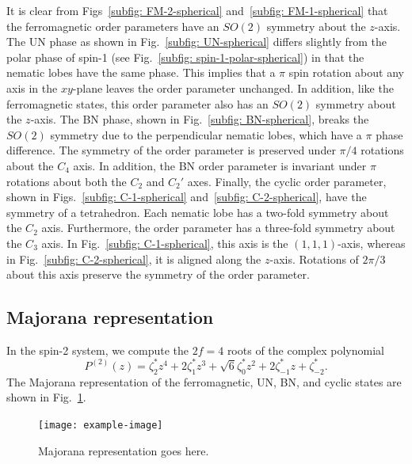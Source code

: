 It is clear from Figs~\ref{subfig: FM-2-spherical}
and~\ref{subfig: FM-1-spherical} that the ferromagnetic order parameters have
an \(SO(2)\) symmetry about the \(z\)-axis.
The UN phase as shown in Fig.~\ref{subfig: UN-spherical} differs slightly from
the polar phase of spin-1 (see Fig.~\ref{subfig: spin-1-polar-spherical}) in
that the nematic lobes have the same phase.
This implies that a \(\pi \) spin rotation about any axis in the \(xy\)-plane
leaves the order parameter unchanged.
In addition, like the ferromagnetic states, this order parameter also has an
\(SO(2)\) symmetry about the \(z\)-axis.
The BN phase, shown in Fig.~\ref{subfig: BN-spherical}, breaks the \(SO(2)\)
symmetry due to the perpendicular nematic lobes, which have a \(\pi \) phase
difference.
The symmetry of the order parameter is preserved under \(\pi/4\) rotations
about the \(C_4\) axis.
In addition, the BN order parameter is invariant under \(\pi \) rotations about
both the \(C_2\) and \(C_2'\) axes.
Finally, the cyclic order parameter, shown in Figs.~\ref{subfig: C-1-spherical}
and~\ref{subfig: C-2-spherical}, have the symmetry of a tetrahedron.
Each nematic lobe has a two-fold symmetry about the \(C_2\) axis.
Furthermore, the order parameter has a three-fold symmetry about the \(C_3\)
axis.
In Fig.~\ref{subfig: C-1-spherical}, this axis is the \((1, 1, 1)\)-axis,
whereas in Fig.~\ref{subfig: C-2-spherical}, it is aligned along the \(z\)-axis.
Rotations of \(2\pi/3\) about this axis preserve the symmetry of the order
parameter.

\subsection{Majorana representation}
In the spin-2 system, we compute the \(2f=4\) roots of the complex polynomial
\begin{equation}
    P^{(2)}(z) = \zeta_2^*z^4 + 2\zeta_1^*z^3 + \sqrt{6}\zeta_0^*z^2
    + 2\zeta_{-1}^*z + \zeta_{-2}^*.
\end{equation}
The Majorana representation of the ferromagnetic, UN, BN, and cyclic states
are shown in Fig.~\ref{fig: spin-2-Majorana}.
\begin{figure}
    \centering
    \texttt{[image: example-image]}
    \caption{\label{fig: spin-2-Majorana}Majorana representation goes here.}
\end{figure}

